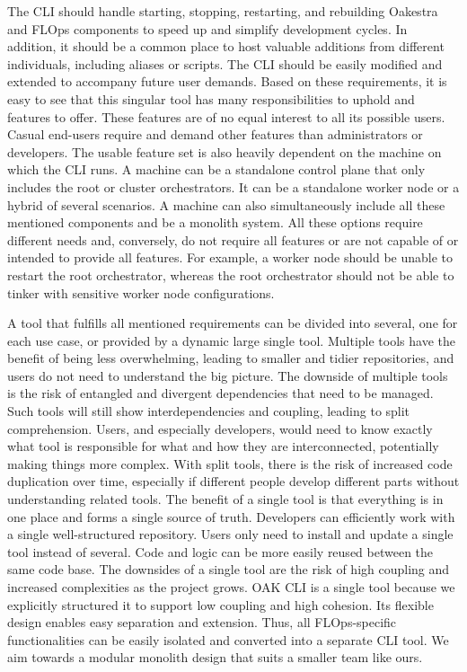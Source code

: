 The CLI should handle starting, stopping, restarting, and rebuilding Oakestra and FLOps components to speed up and simplify development cycles.
In addition, it should be a common place to host valuable additions from different individuals, including aliases or scripts.
The CLI should be easily modified and extended to accompany future user demands.
\vspace{5mm}
\newline
Based on these requirements, it is easy to see that this singular tool has many responsibilities to uphold and features to offer.
These features are of no equal interest to all its possible users.
Casual end-users require and demand other features than administrators or developers.
The usable feature set is also heavily dependent on the machine on which the CLI runs.
A machine can be a standalone control plane that only includes the root or cluster orchestrators.
It can be a standalone worker node or a hybrid of several scenarios.
A machine can also simultaneously include all these mentioned components and be a monolith system.
All these options require different needs and, conversely, do not require all features or are not capable of or intended to provide all features.
For example, a worker node should be unable to restart the root orchestrator, whereas the root orchestrator should not be able to tinker with sensitive worker node configurations.

A tool that fulfills all mentioned requirements can be divided into several, one for each use case, or provided by a dynamic large single tool.
Multiple tools have the benefit of being less overwhelming, leading to smaller and tidier repositories, and users do not need to understand the big picture.
The downside of multiple tools is the risk of entangled and divergent dependencies that need to be managed.
Such tools will still show interdependencies and coupling, leading to split comprehension.
Users, and especially developers, would need to know exactly what tool is responsible for what and how they are interconnected, potentially making things more complex.
With split tools, there is the risk of increased code duplication over time, especially if different people develop different parts without understanding related tools.
The benefit of a single tool is that everything is in one place and forms a single source of truth.
Developers can efficiently work with a single well-structured repository.
Users only need to install and update a single tool instead of several.
Code and logic can be more easily reused between the same code base.
The downsides of a single tool are the risk of high coupling and increased complexities as the project grows.
OAK CLI is a single tool because we explicitly structured it to support low coupling and high cohesion.
Its flexible design enables easy separation and extension.
Thus, all FLOps-specific functionalities can be easily isolated and converted into a separate CLI tool.
We aim towards a modular monolith design that suits a smaller team like ours.
